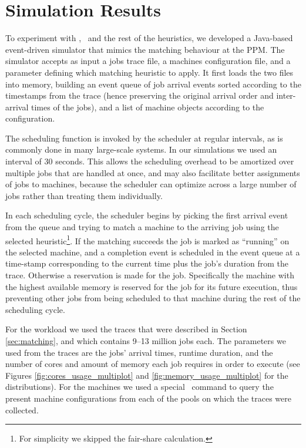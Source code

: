 \chapter{Simulation Results}
\label{sec:sim_results}

To experiment with \maj, \mif\ and the rest of the heuristics, we
developed a Java-based event-driven simulator \cite{simba} that mimics the
matching behaviour at the PPM.
The simulator accepts as input a jobs trace file, 
a machines configuration file, and a parameter defining which matching heuristic
to apply.
It first loads the two files into memory, building an event queue of
job arrival events sorted according to the timestamps from the trace 
(hence preserving the original arrival order and inter-arrival times of the jobs), 
and a list of machine objects according to the configuration.

The scheduling function is invoked by the scheduler at regular
intervals, as is commonly done in many large-scale systems.
In our simulations we used an interval of 30 seconds.
This allows the scheduling overhead to be amortized over multiple jobs
that are handled at once, 
and may also facilitate better assignments of jobs to machines, because
the scheduler can optimize across a large number of jobs rather than
treating them individually.

In each scheduling cycle, the scheduler begins by picking the first
arrival event from the queue and trying to match a machine to the
arriving job using the selected heuristic\footnote{For simplicity we skipped the fair-share calculation.}.
If the matching succeeds the job is marked as ``running'' on the
selected machine, and a completion event is scheduled in the event
queue at a time-stamp corresponding to the current time plus the job's
duration from the trace.
Otherwise a reservation is made for the job.
Specifically the machine with the highest available memory is reserved
for the job for its future execution, thus preventing other jobs from
being scheduled to that machine during the rest of the scheduling cycle. 


For the workload we used the traces that were described in Section
\ref{sec:matching}, and which contains 9--13 million jobs each.
The parameters we used from the traces are the jobs' arrival times,
runtime duration, and the number of cores and amount of memory each
job requires in order to execute (see Figures
\ref{fig:cores_usage_multiplot} and \ref{fig:memory_usage_multiplot}
for the distributions).
For the machines we used a special \nb\ command to query the present
machine configurations from each of the pools on which the traces were
collected.

